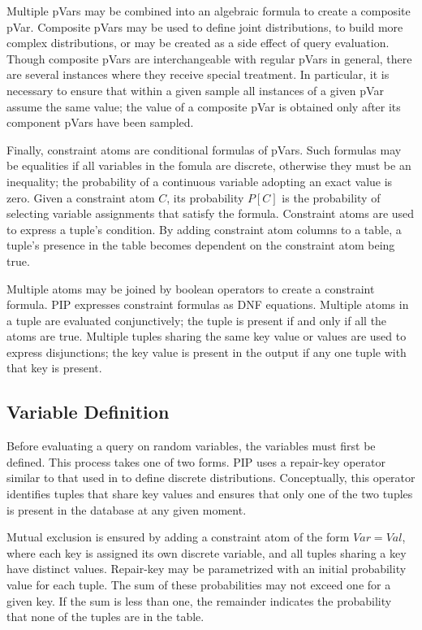 Multiple pVars may be combined into an algebraic formula to create a composite pVar.  Composite pVars may be used to define joint distributions, to build more complex distributions, or may be created as a side effect of query evaluation.  Though composite pVars are interchangeable with regular pVars in general, there are several instances where they receive special treatment.  In particular, it is necessary to ensure that within a given sample all instances of a given pVar assume the same value; the value of a composite pVar is obtained only after its component pVars have been sampled.

Finally, constraint atoms are conditional formulas of pVars.  Such formulas may be equalities if all variables in the fomula are discrete, otherwise they must be an inequality; the probability of a continuous variable adopting an exact value is zero.  Given a constraint atom $C$, its probability $P[C]$ is the probability of selecting variable assignments that satisfy the formula.  Constraint atoms are used to express a tuple's condition.  By adding constraint atom columns to a table, a tuple's presence in the table becomes dependent on the constraint atom being true.  

Multiple atoms may be joined by boolean operators to create a constraint formula.  PIP expresses constraint formulas as DNF equations.  Multiple atoms in a tuple are evaluated conjunctively; the tuple is present if and only if all the atoms are true.  Multiple tuples sharing the same key value or values are used to express disjunctions; the key value is present in the output if any one tuple with that key is present.

\subsection{Variable Definition}
Before evaluating a query on random variables, the variables must first be defined.  This process takes one of two forms.  PIP uses a repair-key operator similar to that used in \cite{KochMayBMS2008} to define discrete distributions.  Conceptually, this operator identifies tuples that share key values and ensures that only one of the two tuples is present in the database at any given moment.  

Mutual exclusion is ensured by adding a constraint atom of the form $Var = Val$, where each key is assigned its own discrete variable, and all tuples sharing a key have distinct values.  Repair-key may be parametrized with an initial probability value for each tuple.  The sum of these probabilities may not exceed one for a given key.  If the sum is less than one, the remainder indicates the probability that none of the tuples are in the table.


